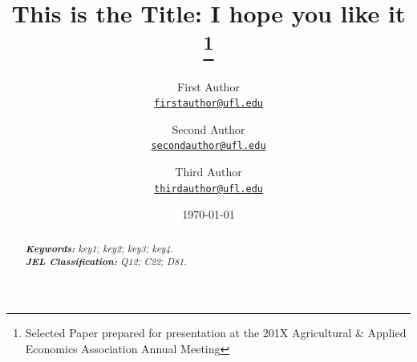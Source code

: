 \documentclass[11pt]{article}
\title{This is the Title: I hope you like it
\thanks{Selected Paper prepared for presentation at the 201X Agricultural \& Applied Economics Association Annual Meeting}
}
\author{First Author\\%
    \href{mailto:firstauthor@ufl.edu}{\texttt{firstauthor@ufl.edu}} %
\and Second Author\\%
    \href{mailto:secondauthor@ufl.edu}{\texttt{secondauthor@ufl.edu}} %
\and Third Author\\%
    \href{mailto:thirdauthor@ufl.edu}{\texttt{thirdauthor@ufl.edu}}%
    }
\date{\today}
\begin{document}
{
\maketitle
\begin{abstract}

\lipsum[1] %

\noindent
\textit{\textbf{Keywords: }%
key1; key2; key3; key4.} \\ %
\noindent
\textit{\textbf{JEL Classification: }%
Q12; C22; D81.} %

\end{abstract}
}








\medskip



\newpage

\end{document}
